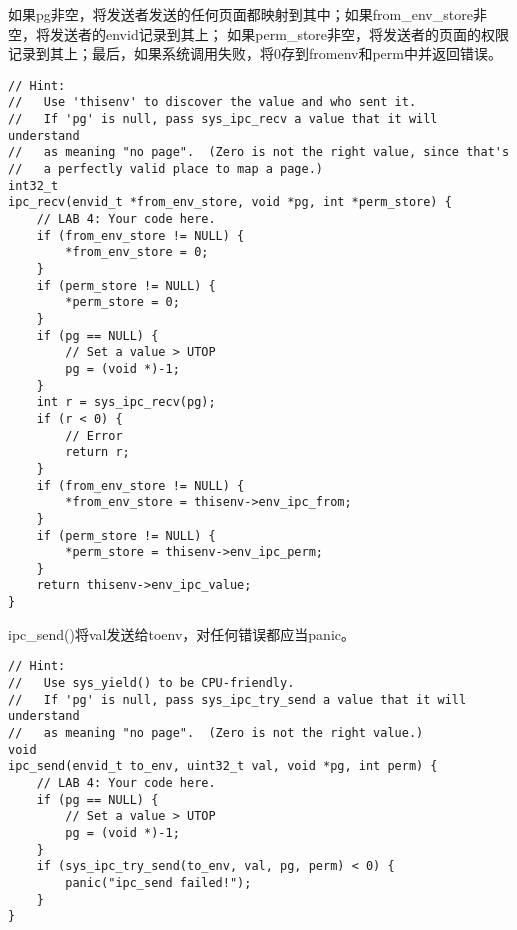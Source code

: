 \documentclass[12pt,a4paper]{article}
\begin{document}
如果pg非空，将发送者发送的任何页面都映射到其中；如果from\_env\_store非空，将发送者的envid记录到其上；
如果perm\_store非空，将发送者的页面的权限记录到其上；最后，如果系统调用失败，将0存到fromenv和perm中并返回错误。
\begin{lstlisting}[style=CPP]
// Hint:
//   Use 'thisenv' to discover the value and who sent it.
//   If 'pg' is null, pass sys_ipc_recv a value that it will understand
//   as meaning "no page".  (Zero is not the right value, since that's
//   a perfectly valid place to map a page.)
int32_t
ipc_recv(envid_t *from_env_store, void *pg, int *perm_store) {
	// LAB 4: Your code here.
	if (from_env_store != NULL) {
		*from_env_store = 0;
	}
	if (perm_store != NULL) {
		*perm_store = 0;
	}
	if (pg == NULL) {
		// Set a value > UTOP
		pg = (void *)-1;
	}
	int r = sys_ipc_recv(pg);
	if (r < 0) {
		// Error
		return r;
	}
	if (from_env_store != NULL) {
		*from_env_store = thisenv->env_ipc_from;
	}
	if (perm_store != NULL) {
		*perm_store = thisenv->env_ipc_perm;
	}
	return thisenv->env_ipc_value;
}
\end{lstlisting}

ipc\_send()将val发送给toenv，对任何错误都应当panic。
\begin{lstlisting}[style=CPP]
// Hint:
//   Use sys_yield() to be CPU-friendly.
//   If 'pg' is null, pass sys_ipc_try_send a value that it will understand
//   as meaning "no page".  (Zero is not the right value.)
void
ipc_send(envid_t to_env, uint32_t val, void *pg, int perm) {
	// LAB 4: Your code here.
	if (pg == NULL) {
		// Set a value > UTOP
		pg = (void *)-1;
	}
	if (sys_ipc_try_send(to_env, val, pg, perm) < 0) {
		panic("ipc_send failed!");
	}
}
\end{lstlisting}
\end{document}
